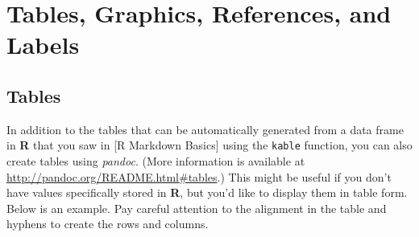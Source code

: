 \documentclass[12pt,twoside]{reedthesis}
\begin{document}
\hypertarget{ref-labels}{%
\chapter{Tables, Graphics, References, and Labels}\label{ref-labels}}

\hypertarget{tables}{%
\section{Tables}\label{tables}}

In addition to the tables that can be automatically generated from a data frame in \textbf{R} that you saw in {[}R Markdown Basics{]} using the \texttt{kable} function, you can also create tables using \emph{pandoc}. (More information is available at \url{http://pandoc.org/README.html\#tables}.) This might be useful if you don't have values specifically stored in \textbf{R}, but you'd like to display them in table form. Below is an example. Pay careful attention to the alignment in the table and hyphens to create the rows and columns.
\end{document}
